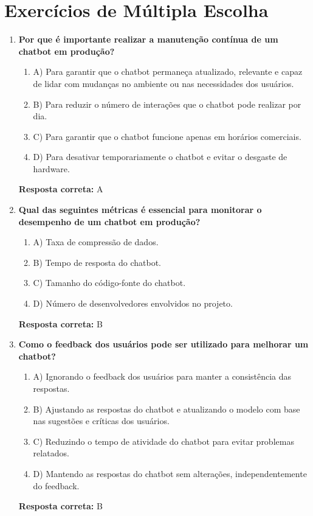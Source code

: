 \documentclass[14pt,a4paper,oneside]{book}
\begin{document}
\section*{Exercícios de Múltipla Escolha}

\begin{enumerate}
	
	\item \textbf{Por que é importante realizar a manutenção contínua de um chatbot em produção?}
	\begin{enumerate}[label=\alph*)]
		\item A) Para garantir que o chatbot permaneça atualizado, relevante e capaz de lidar com mudanças no ambiente ou nas necessidades dos usuários.
		\item B) Para reduzir o número de interações que o chatbot pode realizar por dia.
		\item C) Para garantir que o chatbot funcione apenas em horários comerciais.
		\item D) Para desativar temporariamente o chatbot e evitar o desgaste de hardware.
	\end{enumerate}
	\vspace{5mm}
	\textbf{Resposta correta:} A
	
	\item \textbf{Qual das seguintes métricas é essencial para monitorar o desempenho de um chatbot em produção?}
	\begin{enumerate}[label=\alph*)]
		\item A) Taxa de compressão de dados.
		\item B) Tempo de resposta do chatbot.
		\item C) Tamanho do código-fonte do chatbot.
		\item D) Número de desenvolvedores envolvidos no projeto.
	\end{enumerate}
	\vspace{5mm}
	\textbf{Resposta correta:} B
	
	\item \textbf{Como o feedback dos usuários pode ser utilizado para melhorar um chatbot?}
	\begin{enumerate}[label=\alph*)]
		\item A) Ignorando o feedback dos usuários para manter a consistência das respostas.
		\item B) Ajustando as respostas do chatbot e atualizando o modelo com base nas sugestões e críticas dos usuários.
		\item C) Reduzindo o tempo de atividade do chatbot para evitar problemas relatados.
		\item D) Mantendo as respostas do chatbot sem alterações, independentemente do feedback.
	\end{enumerate}
	\vspace{5mm}
	\textbf{Resposta correta:} B
	

\end{enumerate}
\end{document}
